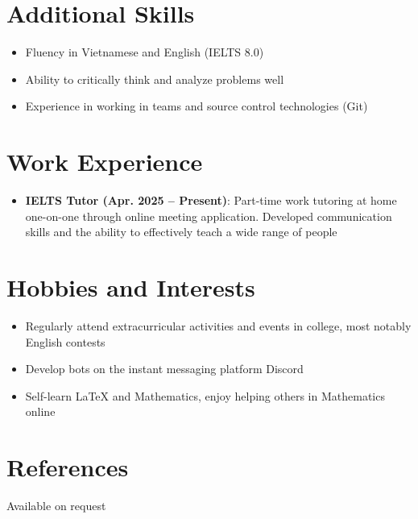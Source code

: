 \documentclass[letterpaper,11pt]{article}
\newcommand{\resumeItem}[2]{
  \item\small{
    \textbf{#1}{#2 \vspace{-2pt}}
  }
}
\newcommand{\resumeSubItem}[2]{\resumeItem{#1}{#2}\vspace{-4pt}}
\newcommand{\resumeSubHeadingListStart}{\begin{itemize}[leftmargin=*]}
\newcommand{\resumeSubHeadingListEnd}{\end{itemize}}
\newcommand{\resumeItemListStart}{\begin{itemize}}
\newcommand{\resumeItemListEnd}{\end{itemize}\vspace{-5pt}}
\begin{document}
\section{Additional Skills}
	\resumeItemListStart
		\resumeItem{}{Fluency in Vietnamese and English (IELTS 8.0)}
		\resumeItem{}{Ability to critically think and analyze problems well}
		\resumeItem{}{Experience in working in teams and source control technologies (Git)}
	\resumeItemListEnd

\section{Work Experience}
	\resumeSubHeadingListStart
		\resumeSubItem{IELTS Tutor (Apr. 2025 -- Present)}{: Part-time work tutoring at home one-on-one through online meeting application. Developed communication skills and the ability to effectively teach a wide range of people}
	\resumeSubHeadingListEnd

\section{Hobbies and Interests}
	\resumeItemListStart
		\resumeItem{}{Regularly attend extracurricular activities and events in college, most notably English contests}
		\resumeItem{}{Develop bots on the instant messaging platform Discord}
		\resumeItem{}{Self-learn LaTeX and Mathematics, enjoy helping others in Mathematics online}
	\resumeItemListEnd

\section{References}
	Available on request

\end{document}
